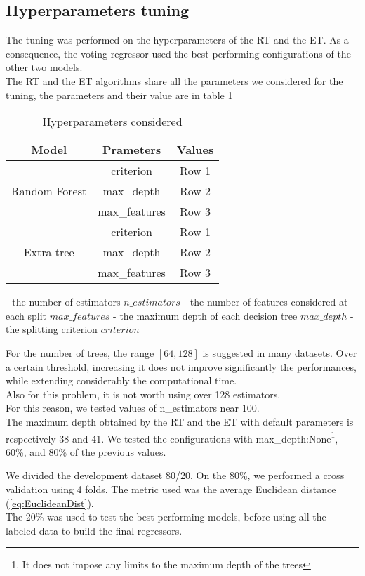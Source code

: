 \documentclass[conference]{IEEEtran}
\begin{document}
\subsection{Hyperparameters tuning}
The tuning was performed on the hyperparameters of the RT and the ET. As a consequence, the voting regressor used the best performing configurations of the other two models. \\
The RT and the ET algorithms share all the parameters we considered for the tuning, the parameters and their value are in table \ref{tab:tabHP}
\begin{table}
    \centering
    \caption{Hyperparameters considered}
    \label{tab:tabHP}
    \begin{tabular}{|c|c|c|}
        \hline
        \textbf{Model} & \textbf{Prameters} & \textbf{Values} \\
        \hline
        &criterion&Row 1\\
        Random Forest&max\_depth&Row 2\\
        &max\_features&Row 3\\
        \hline
        &criterion&Row 1\\
        Extra tree&max\_depth&Row 2\\
        &max\_features&Row 3\\
        \hline
    \end{tabular}
\end{table}
- the number of estimators $n\_estimators$
- the number of features considered at each split $max\_features$
- the maximum depth of each decision tree $max\_depth$
- the splitting criterion $criterion$

For the number of trees, the range $[64, 128]$ is suggested in many datasets\cite{limitNumTrees}. Over a certain threshold, increasing it does not improve significantly the performances, while extending considerably the computational time. \\
Also for this problem, it is not worth using over 128 estimators. \\
For this reason, we tested values of n\_estimators near 100. \\

The maximum depth obtained by the RT and the ET with default parameters is respectively 38 and 41. We tested the configurations with max\_depth:None\footnote{It does not impose any limits to the maximum depth of the trees}, 60\%, and 80\% of the previous values. 

We divided the development dataset 80/20. On the 80\%, we performed a cross validation using 4 folds. The metric used was the average Euclidean distance (\ref{eq:EuclideanDist}).\\
The 20\% was used to test the best performing models, before using all the labeled data to build the final regressors.
\end{document}
